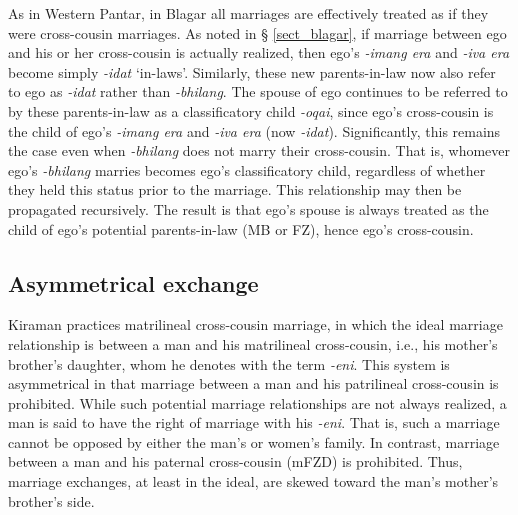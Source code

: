 As in Western Pantar, in Blagar all marriages are effectively treated as if they were cross-cousin marriages. As noted in {\S} \ref{sect_blagar}, if marriage between ego and his or her cross-cousin is actually realized, then ego's \textit{-imang era} and \textit{-iva era} become simply \textit{-idat} `in-laws'. Similarly, these new parents-in-law now also refer to ego as \textit{-idat} rather than \textit{-bhilang}. The spouse of ego continues to be referred to by these parents-in-law as a classificatory child \textit{-oqai}, since ego's cross-cousin is the child of ego's \textit{-imang era} and \textit{-iva era} (now \textit{-idat}). Significantly, this remains the case even when \textit{-bhilang} does not marry their cross-cousin. That is, whomever ego's \textit{-bhilang} marries becomes ego's classificatory child, regardless of whether they held this status prior to the marriage. This relationship may then be propagated recursively. The result is that ego's spouse is always treated as the child of ego's potential parents-in-law (MB or FZ), hence ego's cross-cousin.

\subsection{Asymmetrical exchange}\label{sect_asymmetrical_exchange}
\label{bkm:Ref247334472}Kiraman practices matrilineal cross-cousin marriage, in which the ideal marriage relationship is between a man and his matrilineal cross-cousin, i.e., his mother's brother's daughter, whom he denotes with the term \textit{-eni}. This system is asymmetrical in that marriage between a man and his patrilineal cross-cousin is prohibited. While such potential marriage relationships are not always realized, a man is said to have the right of marriage with his \textit{-eni}. That is, such a marriage cannot be opposed by either the man's or women's family. In contrast, marriage between a man and his paternal cross-cousin (mFZD) is prohibited. Thus, marriage exchanges, at least in the ideal, are skewed toward the man's mother's brother's side.

